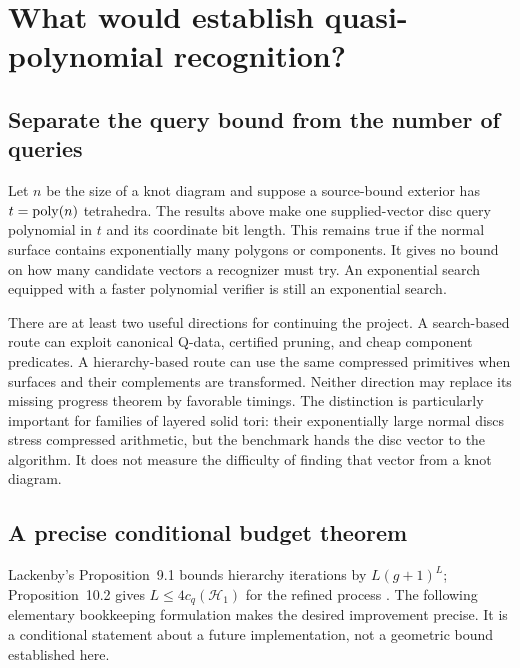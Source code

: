 \section{What would establish quasi-polynomial recognition?}
\label{sec:roadmap}

\subsection{Separate the query bound from the number of queries}

Let $n$ be the size of a knot diagram and suppose a source-bound exterior has
$t=\operatorname{poly}(n)$ tetrahedra. The results above make one supplied-vector disc query
polynomial in $t$ and its coordinate bit length. This remains true if the
normal surface contains exponentially many polygons or components. It gives
no bound on how many candidate vectors a recognizer must try. An exponential
search equipped with a faster polynomial verifier is still an exponential
search.

There are at least two useful directions for continuing the project. A
search-based route can exploit canonical Q-data, certified pruning, and cheap
component predicates. A hierarchy-based route can use the same compressed
primitives when surfaces and their complements are transformed. Neither
direction may replace its missing progress theorem by favorable timings.
The distinction is particularly important for families of layered solid tori:
their exponentially large normal discs stress compressed arithmetic, but the
benchmark hands the disc vector to the algorithm. It does not measure the
difficulty of finding that vector from a knot diagram.

\subsection{A precise conditional budget theorem}

Lackenby's Proposition~9.1 bounds hierarchy iterations by $L(g+1)^L$;
Proposition~10.2 gives $L\le4c_q(\mathcal H_1)$ for the refined process
\cite{Lackenby2026}. The following elementary bookkeeping formulation makes
the desired improvement precise. It is a conditional statement about a
future implementation, not a geometric bound established here.

